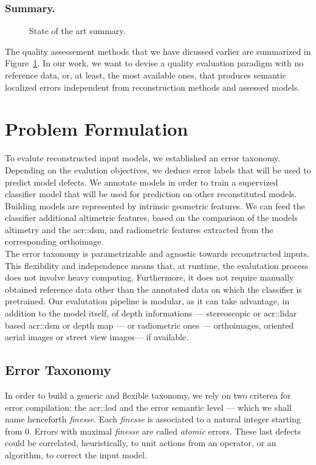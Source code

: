 \documentclass[runningheads]{llncs}
\begin{document}
\subsubsection{Summary.}
\begin{figure}[H]
	\begin{center}
		
		\caption{\label{fig::state_of_art} State of the art summary.}
	\end{center}
\end{figure}
The quality assessement methods that we have dicussed earlier are summarized in Figure~\ref{fig::state_of_art}. In our work, we want to devise a quality evaluation paradigm with no reference data, or, at least, the most available ones, that produces semantic localized errors independent from reconstruction methods and assessed models.
\section{Problem Formulation}
To evalute reconstructed input models, we established an error taxonomy. Depending on the evalution objectives, we deduce error labels that will be used to predict model defects. We annotate models in order to train a supervized classifier model that will be used for prediction on other reconstituted models. Building models are represented by intrinsic geometric features. We can feed the classifier additional altimetric features, based on the comparison of the models altimetry and the \acrshort{acr::dsm}, and radiometric features extracted from the corresponding orthoimage.\\

The error taxonomy is parametrizable and agnostic towards reconstructed inputs. This flexibility and independence means that, at runtime, the evalutation process does not involve heavy computing. Furthermore, it does not require manually obtained reference data other than the annotated data on which the classifier is pretrained. Our evalutation pipeline is modular, as it can take advantage, in addition to the model itself, of depth informations --- stereoscopic or \acrfull{acr::lidar} based \acrshort{acr::dsm} or depth map  --- or radiometric ones --- orthoimages, oriented aerial images or street view images--- if available.
\subsection{Error Taxonomy}
In order to build a generic and flexible taxonomy, we rely on two criterea for error compilation: the \acrshort{acr::lod} and the error semantic level --- which we shall name henceforth \textit{finesse}. Each \textit{finesse} is associated to a natural integer starting from $0$. Errors with maximal \textit{finesse} are called \textit{atomic} errors. These last defects could be correlated, heuristically, to unit actions from an operator, or an algorithm, to correct the input model.\\
\end{document}
